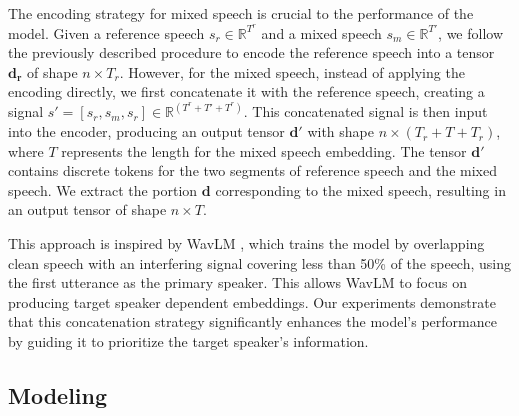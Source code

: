 \documentclass[conference]{IEEEtran}
\begin{document}
The encoding strategy for mixed speech is crucial to the performance of the model. Given a reference speech \(s_r \in \mathbb{R}^{T^r}\) and a mixed speech \(s_m \in \mathbb{R}^{T'}\), we follow the previously described procedure to encode the reference speech into a tensor \(\bm{d_r}\) of shape \(n \times T_r\). However, for the mixed speech, instead of applying the encoding directly, we first concatenate it with the reference speech, creating a signal \(s' = [s_r, s_m, s_r] \in \mathbb{R}^{(T^r + T' + T^r)}\). This concatenated signal is then input into the encoder, producing an output tensor \(\bm{d'}\) with shape \(n \times (T_r + T + T_r)\), where \(T\) represents the length for the mixed speech embedding. The tensor \(\bm{d'}\) contains discrete tokens for the two segments of reference speech and the mixed speech. We extract the portion \(\bm{d}\) corresponding to the mixed speech, resulting in an output tensor of shape \(n \times T\).

This approach is inspired by WavLM \cite{wavlm}, which trains the model by overlapping clean speech with an interfering signal covering less than 50\% of the speech, using the first utterance as the primary speaker. This allows WavLM to focus on producing target speaker dependent embeddings. Our experiments demonstrate that this concatenation strategy significantly enhances the model's performance by guiding it to prioritize the target speaker's information.
\subsection{Modeling}
\end{document}
